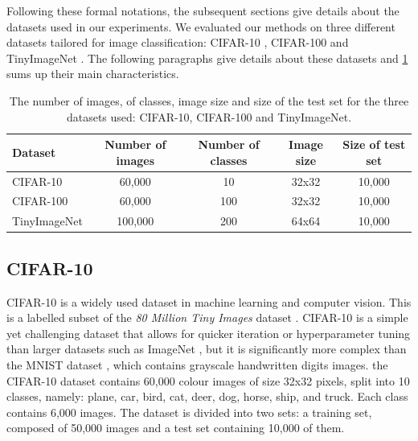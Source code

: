 Following these formal notations, the subsequent sections give details about the
datasets used in our experiments. We evaluated our methods on three different
datasets tailored for image classification: CIFAR-10 \cite{CIFARdataset},
CIFAR-100 \cite{CIFARdataset} and TinyImageNet \cite{TinyImageNet}. The
following paragraphs give details about these datasets and
\cref{tab:dlo:datasets} sums up their main characteristics.\\

\begin{table}[ht!]
  \centering
  \begin{tabular}{lcccc}
    \toprule
    \textbf{Dataset}    & \textbf{Number of images} & \textbf{Number of classes} &
    \textbf{Image size} & \textbf{Size of test set}                                               \\
    \hline
    CIFAR-10            & 60,000                    & 10                         & 32x32 & 10,000 \\
    CIFAR-100           & 60,000                    & 100                        & 32x32 & 10,000 \\
    TinyImageNet        & 100,000                   & 200                        & 64x64 & 10,000 \\
    \bottomrule
  \end{tabular}
  \caption{The number of images, of classes, image size and size of the test
    set for the three datasets used: CIFAR-10, CIFAR-100 and TinyImageNet.}
  \label{tab:dlo:datasets}
\end{table}

\subsection{CIFAR-10}

CIFAR-10 \cite{CIFARdataset} is a widely used dataset in machine learning and
computer vision. This is a labelled subset of the \emph{80 Million Tiny Images}
dataset \cite{4531741}. CIFAR-10 is a simple yet challenging dataset that allows
for quicker iteration or hyperparameter tuning than larger datasets such as
ImageNet \cite{DBLP:journals/ijcv/RussakovskyDSKS15}, but it is significantly
more complex than the MNIST dataset \cite{6296535}, which contains grayscale
handwritten digits images. the CIFAR-10 dataset contains 60,000 colour images of
size 32x32 pixels, split into 10 classes, namely: plane, car, bird, cat, deer,
dog, horse, ship, and truck. Each class contains 6,000 images. The dataset is
divided into two sets: a training set, composed of 50,000 images and a test set
containing 10,000 of them.\\

